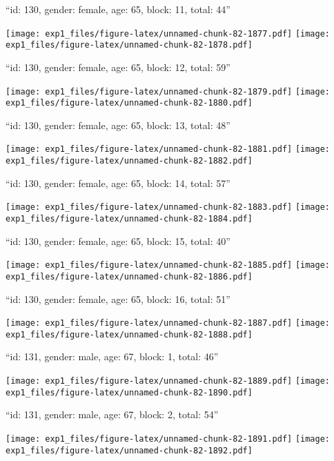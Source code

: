 \documentclass[11pt,,]{article}
\begin{document}
\newpage
[1] 

``id: 130, gender: female, age: 65, block: 11, total: 44''

\texttt{[image: exp1\_files/figure-latex/unnamed-chunk-82-1877.pdf]}
\texttt{[image: exp1\_files/figure-latex/unnamed-chunk-82-1878.pdf]}

\newpage
[1] 

``id: 130, gender: female, age: 65, block: 12, total: 59''

\texttt{[image: exp1\_files/figure-latex/unnamed-chunk-82-1879.pdf]}
\texttt{[image: exp1\_files/figure-latex/unnamed-chunk-82-1880.pdf]}

\newpage
[1] 

``id: 130, gender: female, age: 65, block: 13, total: 48''

\texttt{[image: exp1\_files/figure-latex/unnamed-chunk-82-1881.pdf]}
\texttt{[image: exp1\_files/figure-latex/unnamed-chunk-82-1882.pdf]}

\newpage
[1] 

``id: 130, gender: female, age: 65, block: 14, total: 57''

\texttt{[image: exp1\_files/figure-latex/unnamed-chunk-82-1883.pdf]}
\texttt{[image: exp1\_files/figure-latex/unnamed-chunk-82-1884.pdf]}

\newpage
[1] 

``id: 130, gender: female, age: 65, block: 15, total: 40''

\texttt{[image: exp1\_files/figure-latex/unnamed-chunk-82-1885.pdf]}
\texttt{[image: exp1\_files/figure-latex/unnamed-chunk-82-1886.pdf]}

\newpage
[1] 

``id: 130, gender: female, age: 65, block: 16, total: 51''

\texttt{[image: exp1\_files/figure-latex/unnamed-chunk-82-1887.pdf]}
\texttt{[image: exp1\_files/figure-latex/unnamed-chunk-82-1888.pdf]}

\newpage
[1] 

``id: 131, gender: male, age: 67, block: 1, total: 46''

\texttt{[image: exp1\_files/figure-latex/unnamed-chunk-82-1889.pdf]}
\texttt{[image: exp1\_files/figure-latex/unnamed-chunk-82-1890.pdf]}

\newpage
[1] 

``id: 131, gender: male, age: 67, block: 2, total: 54''

\texttt{[image: exp1\_files/figure-latex/unnamed-chunk-82-1891.pdf]}
\texttt{[image: exp1\_files/figure-latex/unnamed-chunk-82-1892.pdf]}
\end{document}
